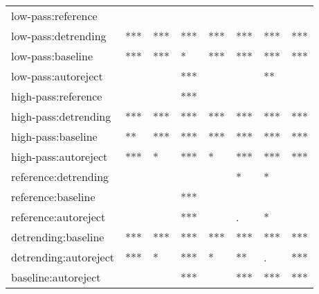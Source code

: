 \begin{table}[!htp]
\begin{widestuff}
\begin{tabular}{llllllll}
  low-pass:reference &   &   &   &   &   &   &   \\ 
  low-pass:detrending & *** & *** & *** & *** & *** & *** & *** \\ 
  low-pass:baseline & *** & *** & * & *** & *** & *** & *** \\ 
  low-pass:autoreject &   &   & *** &   &   & ** &   \\ 
  high-pass:reference &   &   & *** &   &   &   &   \\ 
  high-pass:detrending & *** & *** & *** & *** & *** & *** & *** \\ 
  high-pass:baseline & ** & *** & *** & *** & *** & *** & *** \\ 
  high-pass:autoreject & *** & * & *** & * & *** & *** & *** \\ 
  reference:detrending &   &   &   &   & * & * &   \\ 
  reference:baseline &   &   & *** &   &   &   &   \\ 
  reference:autoreject &   &   & *** &   & . & * &   \\ 
  detrending:baseline & *** & *** & *** & *** & *** & *** & *** \\ 
  detrending:autoreject & *** & * & *** & * & ** & . & *** \\ 
  baseline:autoreject &   &   & *** &   & *** & *** & *** \\ 
   \hline
\end{tabular}
\end{widestuff}
\end{table}
